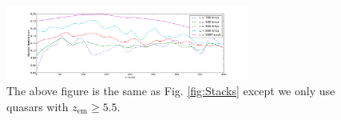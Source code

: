 \documentclass[11pt]{article}
\begin{document}


\begin{figure}[h]
  \centering
  \includegraphics[width=8cm]{Stacks_ZGreaterThan5p5.png}
  \caption{The above figure is the same as Fig. \ref{fig:Stacks} except we only use quasars with $z _{\text{em}} \geq 5.5$.}
  \label{fig:todo}
\end{figure}
\end{document}
